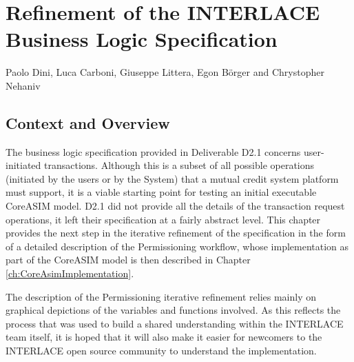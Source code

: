 \chapter{Refinement of the INTERLACE Business Logic Specification}
\label{ch:UpdateBLS}

\vspace{-1cm}
\begin{center}
Paolo Dini, Luca Carboni, Giuseppe Littera, Egon B\"orger and Chrystopher Nehaniv
\end{center}

\section{Context and Overview}
The business logic specification provided in Deliverable D2.1 \cite{INTERLACE_D21} concerns user-initiated transactions. Although this is a subset of all possible operations (initiated by the users or by the System) that a mutual credit system platform must support, it is a viable starting point for testing an initial executable CoreASIM model. D2.1 did not provide all the details of the transaction request operations, it left their specification at a fairly abstract level. This chapter provides the next step in the iterative refinement of the specification in the form of a detailed description of the Permissioning workflow, whose implementation as part of the CoreASIM model is then described in Chapter \ref{ch:CoreAsimImplementation}.

The description of the Permissioning iterative refinement relies mainly on graphical depictions of the variables and functions involved. As this reflects the process that was used to build a shared understanding within the INTERLACE team itself, it is hoped that it will also make it easier for newcomers to the INTERLACE open source community to understand the implementation.

